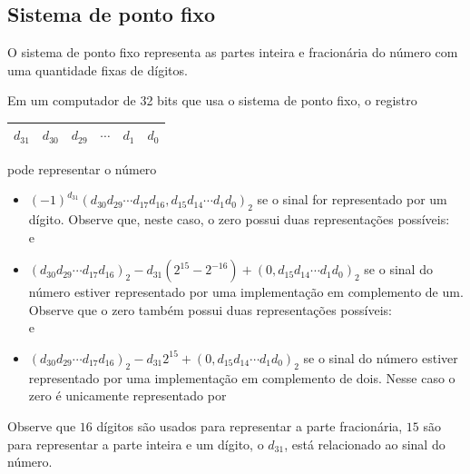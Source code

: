 \subsection{Sistema de ponto fixo}

O sistema de ponto fixo representa as partes inteira e fracionária do número com uma quantidade fixas de dígitos.

\begin{ex}
Em um computador de 32 bits que usa o sistema de ponto fixo, o registro
\begin{center}
  \begin{tabular}{|c|c|c|c|c|c|} \hline
    $d_{31}$ & $d_{30}$ & $d_{29}$ & $\cdots$ & $d_1$ & $d_0$\\\hline
  \end{tabular}  
\end{center}
pode representar o número
\begin{itemize}
\item $(-1)^{d_{31}}(d_{30}d_{29}\cdots d_{17}d_{16}, d_{15}d_{14}\cdots d_1d_0)_2$
se o sinal for representado por um dígito. Observe que, neste caso, o zero possui duas representações possíveis: 
\begin{equation*}
  [10000000000000000000000000000000]
\end{equation*}
e
\begin{equation*}
  [00000000000000000000000000000000]
\end{equation*}
\item $(d_{30}d_{29}\cdots d_{17}d_{16})_2-d_{31}(2^{15}-2^{-16})+(0,d_{15}d_{14}\cdots d_1d_0)_2$
se o sinal do número estiver representado por uma implementação em complemento de um. Observe que o zero também possui duas representações possíveis: 
\begin{equation*}
  [11111111111111111111111111111111]
\end{equation*}
e
\begin{equation*}
  [00000000000000000000000000000000]
\end{equation*}
\item $(d_{30}d_{29}\cdots d_{17}d_{16})_2-d_{31}2^{15}+(0,d_{15}d_{14}\cdots d_1d_0)_2$
se o sinal do número estiver representado por uma implementação em complemento de dois. Nesse caso o zero é unicamente representado por
\begin{equation*}
  [00000000000000000000000000000000]
\end{equation*}
\end{itemize}
Observe que $16$ dígitos são usados para representar a parte fracionária, $15$ são para representar a parte inteira e um dígito, o $d_{31}$, está relacionado ao sinal do número.
\end{ex}

